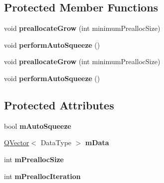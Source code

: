 \subsection*{Protected Member Functions}
\begin{DoxyCompactItemize}
\item 
\mbox{\label{class_q_c_p_data_container_aae8cdb2bcc3b900ec22f26df3e7d67c7}} 
void {\bfseries preallocate\+Grow} (int minimum\+Prealloc\+Size)
\item 
\mbox{\label{class_q_c_p_data_container_a83c25ac14be1c920df85e797ee75c982}} 
void {\bfseries perform\+Auto\+Squeeze} ()
\item 
\mbox{\label{class_q_c_p_data_container_aae8cdb2bcc3b900ec22f26df3e7d67c7}} 
void {\bfseries preallocate\+Grow} (int minimum\+Prealloc\+Size)
\item 
\mbox{\label{class_q_c_p_data_container_a83c25ac14be1c920df85e797ee75c982}} 
void {\bfseries perform\+Auto\+Squeeze} ()
\end{DoxyCompactItemize}
\subsection*{Protected Attributes}
\begin{DoxyCompactItemize}
\item 
\mbox{\label{class_q_c_p_data_container_aae64c517d64511ad7a81ff8ee7b29147}} 
bool {\bfseries m\+Auto\+Squeeze}
\item 
\mbox{\label{class_q_c_p_data_container_a2ee68eef8975c644d3e43158fe1ba798}} 
\hyperlink{class_q_vector}{Q\+Vector}$<$ Data\+Type $>$ {\bfseries m\+Data}
\item 
\mbox{\label{class_q_c_p_data_container_a3554d3ad00e69f7ce057efa00ea6f4b2}} 
int {\bfseries m\+Prealloc\+Size}
\item 
\mbox{\label{class_q_c_p_data_container_ab2115bf023c29691f441eaf1889de84a}} 
int {\bfseries m\+Prealloc\+Iteration}
\end{DoxyCompactItemize}
